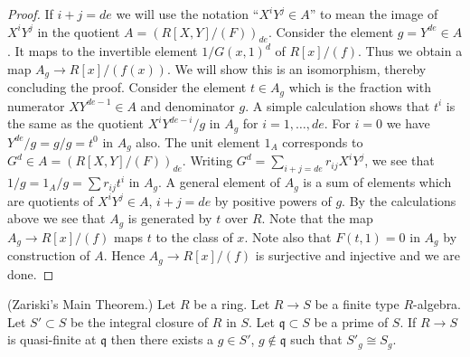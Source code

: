 \begin{proof}
\medskip\noindent
If $i+j = de$ we will use the notation ``$X^iY^j \in A$'' to mean
the image of $X^iY^j$ in the quotient $A = (R[X, Y]/(F))_{de}$.
Consider the element $g = Y^{de} \in A$.
It maps to the invertible element $1/G(x,1)^d$ of
$R[x]/(f)$. Thus we obtain a map $A_g \to R[x]/(f(x))$.
We will show this is an isomorphism, thereby concluding the proof.
Consider the element $t \in A_g$ which is the fraction
with numerator $XY^{de - 1} \in A$ and denominator $g$.
A simple calculation shows that $t^i$ is the same
as the quotient $X^i Y^{de-i}/g$ in $A_g$ for
$i = 1, \ldots, de$. For $i = 0$ we have $Y^{de}/g = g/g = t^0$
in $A_g$ also.
The unit element $1_A$ corresponds to $G^d \in A = (R[X, Y]/(F))_{de}$.
Writing $G^d = \sum_{i+j = de} r_{ij}X^iY^j$,
we see that $1/g = 1_A/g = \sum r_{ij}t^i$ in $A_g$. 
A general element of $A_g$ is a sum of elements which are
quotients of $X^iY^j \in A$, $i + j = de$ by positive
powers of $g$. By the calculations above
we see that $A_g$ is generated by $t$ over $R$.
Note that the map $A_g \to R[x]/(f)$ maps $t$ to the
class of $x$. Note also that $F(t, 1) = 0$ in $A_g$ by construction
of $A$. Hence $A_g \to R[x]/(f)$ is surjective and injective
and we are done.
\end{proof}

\begin{theorem}
\label{theorem-main-theorem}
(Zariski's Main Theorem.)
Let $R$ be a ring. Let $R \to S$ be a finite type $R$-algebra.
Let $S' \subset S$ be the integral closure of $R$ in $S$.
Let $\mathfrak q \subset S$ be a prime of $S$.
If $R \to S$ is quasi-finite at $\mathfrak q$ then
there exists a $g \in S'$, $g \not \in \mathfrak q$
such that $S'_g \cong S_g$.
\end{theorem}

